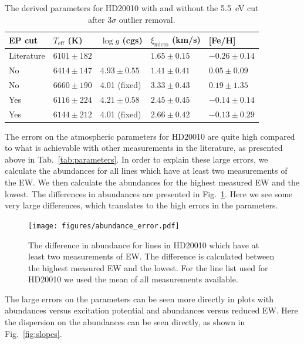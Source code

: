 \documentclass{aa}
\begin{document}
\begin{table}[htb!]
    \caption{The derived parameters for HD20010 with and without the
    \SI{5.5}{eV} cut after 3$\sigma$ outlier removal.}
    \label{tab:hd20010}
    \centering
    \begin{tabular}{lllll}
      \hline\hline
        EP cut       & $T_\mathrm{eff}$ (K) &  $\log g$ (cgs)  &   $\xi_\mathrm{micro}$ (km/s)  & [Fe/H]           \\
      \hline
        Literature   & $6101 \pm 182$       &                  &    $1.65 \pm0.15$               & $-0.26 \pm 0.14$ \\
      \hline
            No       & $6414 \pm 147$       &  $4.93 \pm 0.55$ &    $1.41 \pm 0.41$              & $ 0.05 \pm 0.09$ \\
            No       & $6660 \pm 190$       &  4.01 (fixed)    &    $3.33 \pm 0.43$              & $ 0.19 \pm 1.35$ \\
            Yes      & $6116 \pm 224$       &  $4.21 \pm 0.58$ &    $2.45 \pm 0.45$              & $-0.14 \pm 0.14$ \\
            Yes      & $6144 \pm 212$       &  4.01 (fixed)    &    $2.66 \pm 0.42$              & $-0.13 \pm 0.29$ \\
      \hline
    \end{tabular}
\end{table}

The errors on the atmospheric parameters for HD20010 are quite high
compared to what is achievable with other measurements in the literature,
as presented above in Tab.~\ref{tab:parameters}. In order to explain these large errors, we calculate
the abundances for all lines which have at least two measurements of the EW.
We then calculate the abundances for the highest measured EW and the lowest.
The differences in abundances are presented in Fig.~\ref{fig:abundance_error}. Here we see
some very large differences, which translates to the high errors in the parameters.

\begin{figure}[tpb!]
    \centering
    \texttt{[image: figures/abundance\_error.pdf]}
    \caption{The difference in abundance for lines in HD20010 which have at
    least two measurements of EW. The difference is calculated between the
    highest measured EW and the lowest. For the line list used for HD20010
    we used the mean of all measurements available.}
    \label{fig:abundance_error}
\end{figure}

The large errors on the parameters can be seen more directly in plots with
abundances versus excitation potential and abundances versus reduced EW.
Here the dispersion on the abundances can be seen directly, as shown in
Fig.~\ref{fig:slopes}.
\end{document}
